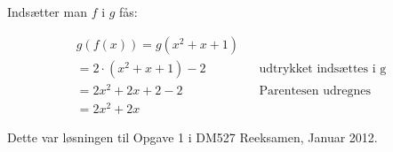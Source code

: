 \documentclass{article}
\begin{document}
Indsætter man $f$ i $g$ fås:
\begin{center}
\begin{align*}
g(f(x)) = g(x^2 + x + 1) \\
= 2 \cdot (x^2 + x + 1) - 2 && \text{udtrykket indsættes i g} \\
= 2x^2 + 2x + 2 - 2 && \text{Parentesen udregnes} \\
= 2x^2 + 2x
\end{align*}
\end{center}

Dette var løsningen til Opgave 1 i DM527 Reeksamen, Januar 2012.
\end{document}
